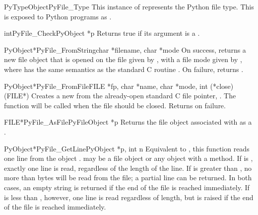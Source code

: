 \documentclass{manual}
\begin{document}
\begin{cvardesc}{PyTypeObject}{PyFile_Type}
This instance of  represents the Python file
type.  This is exposed to Python programs as .
\end{cvardesc}

\begin{cfuncdesc}{int}{PyFile_Check}{PyObject *p}
Returns true if its argument is a .
\end{cfuncdesc}

\begin{cfuncdesc}{PyObject*}{PyFile_FromString}{char *filename, char *mode}
On success, returns a new file object that is opened on the
file given by , with a file mode given by ,
where  has the same semantics as the standard C routine
.  On failure, returns \NULL.
\end{cfuncdesc}

\begin{cfuncdesc}{PyObject*}{PyFile_FromFile}{FILE *fp,
                                              char *name, char *mode,
                                              int (*close)(FILE*)}
Creates a new  from the already-open standard C
file pointer, .  The function  will be called when
the file should be closed.  Returns \NULL{} on failure.
\end{cfuncdesc}

\begin{cfuncdesc}{FILE*}{PyFile_AsFile}{PyFileObject *p}
Returns the file object associated with  as a .
\end{cfuncdesc}

\begin{cfuncdesc}{PyObject*}{PyFile_GetLine}{PyObject *p, int n}
Equivalent to , this
function reads one line from the object .   may be a
file object or any object with a  method.  If
 is , exactly one line is read, regardless of the
length of the line.  If  is greater than , no more than 
 bytes will be read from the file; a partial line can be
returned.  In both cases, an empty string is returned if the end of
the file is reached immediately.  If  is less than ,
however, one line is read regardless of length, but
 is raised if the end of the file is reached
immediately.
\end{cfuncdesc}
\end{document}
